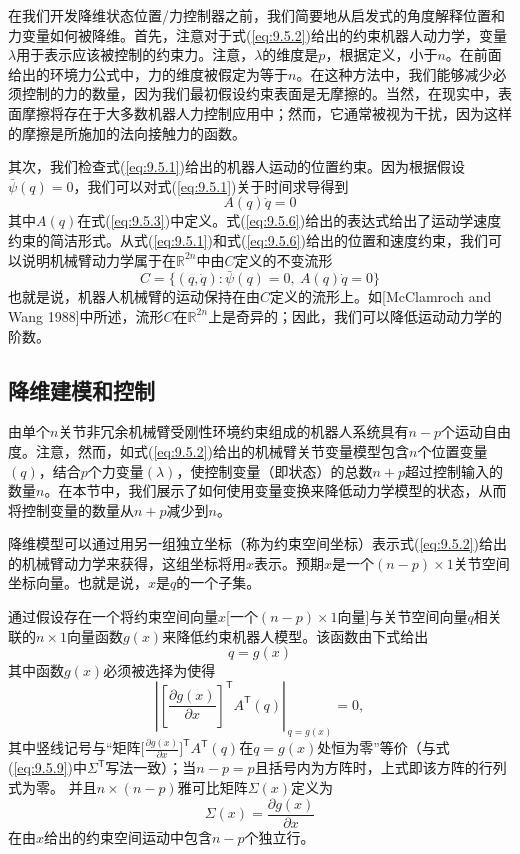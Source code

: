 \documentclass[12pt,a4paper]{ctexart}
\begin{document}
在我们开发降维状态位置/力控制器之前，我们简要地从启发式的角度解释位置和力变量如何被降维。首先，注意对于式(\ref{eq:9.5.2})给出的约束机器人动力学，变量$\lambda$用于表示应该被控制的约束力。注意，$\lambda$的维度是$p$，根据定义，小于$n$。在前面给出的环境力公式中，力的维度被假定为等于$n$。在这种方法中，我们能够减少必须控制的力的数量，因为我们最初假设约束表面是无摩擦的。当然，在现实中，表面摩擦将存在于大多数机器人力控制应用中；然而，它通常被视为干扰，因为这样的摩擦是所施加的法向接触力的函数。

其次，我们检查式(\ref{eq:9.5.1})给出的机器人运动的位置约束。因为根据假设$\bar{\psi}(q) = 0$，我们可以对式(\ref{eq:9.5.1})关于时间求导得到
\begin{equation}\label{eq:9.5.6}
A(q)\dot{q} = 0
\end{equation}
其中$A(q)$在式(\ref{eq:9.5.3})中定义。式(\ref{eq:9.5.6})给出的表达式给出了运动学速度约束的简洁形式。从式(\ref{eq:9.5.1})和式(\ref{eq:9.5.6})给出的位置和速度约束，我们可以说明机械臂动力学属于在$\mathbb{R}^{2n}$中由$C$定义的不变流形
\[
C = \{(q, \dot{q}) : \bar{\psi}(q) = 0,\ A(q)\dot{q} = 0\}
\]
也就是说，机器人机械臂的运动保持在由$C$定义的流形上。如[McClamroch and Wang 1988]中所述，流形$C$在$\mathbb{R}^{2n}$上是奇异的；因此，我们可以降低运动动力学的阶数。

\subsection{降维建模和控制}

由单个$n$关节非冗余机械臂受刚性环境约束组成的机器人系统具有$n - p$个运动自由度。注意，然而，如式(\ref{eq:9.5.2})给出的机械臂关节变量模型包含$n$个位置变量$(q)$，结合$p$个力变量$(\lambda)$，使控制变量（即状态）的总数$n + p$超过控制输入的数量$n$。在本节中，我们展示了如何使用变量变换来降低动力学模型的状态，从而将控制变量的数量从$n + p$减少到$n$。

降维模型可以通过用另一组独立坐标（称为约束空间坐标）表示式(\ref{eq:9.5.2})给出的机械臂动力学来获得，这组坐标将用$x$表示。预期$x$是一个$(n - p) \times 1$关节空间坐标向量。也就是说，$x$是$q$的一个子集。

通过假设存在一个将约束空间向量$x$[一个$(n - p) \times 1$向量]与关节空间向量$q$相关联的$n \times 1$向量函数$g(x)$来降低约束机器人模型。该函数由下式给出
\begin{equation}\label{eq:9.5.7}
q = g(x)
\end{equation}
其中函数$g(x)$必须被选择为使得
\begin{equation}\label{eq:9.5.8}
\left\lvert\left[\frac{\partial g(x)}{\partial x}\right]^{\mathsf T} A^{\mathsf T}(q)\right\rvert_{\,q=g(x)} = 0,
\end{equation}
其中竖线记号与``矩阵$\bigl[\frac{\partial g(x)}{\partial x}\bigr]^{\mathsf T} A^{\mathsf T}(q)$在$q=g(x)$处恒为零''等价（与式(\ref{eq:9.5.9})中$\Sigma^{\mathsf T}$写法一致）；当$n-p=p$且括号内为方阵时，上式即该方阵的行列式为零。
并且$n \times (n - p)$雅可比矩阵$\Sigma(x)$定义为
\begin{equation}\label{eq:9.5.9}
\Sigma(x) = \frac{\partial g(x)}{\partial x}
\end{equation}
在由$x$给出的约束空间运动中包含$n - p$个独立行。
\end{document}
